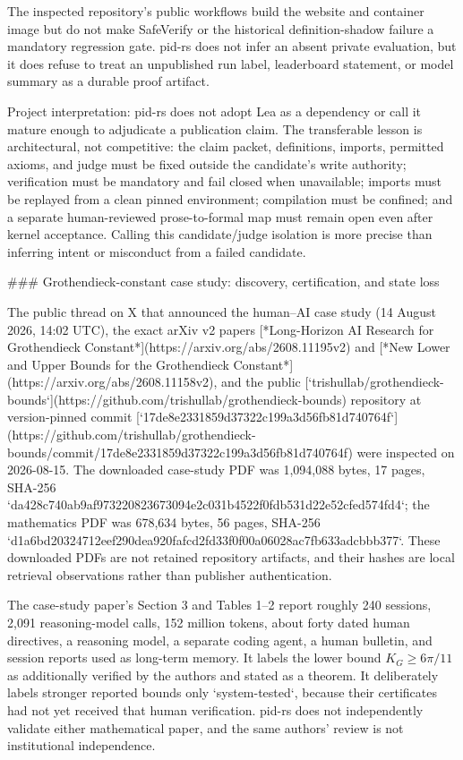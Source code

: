 \documentclass[11pt]{article}
\begin{document}
\begin{markdown}
The inspected repository's public workflows build the website and container image but do not make
SafeVerify or the historical definition-shadow failure a mandatory regression gate. pid-rs does
not infer an absent private evaluation, but it does refuse to treat an unpublished run label,
leaderboard statement, or model summary as a durable proof artifact.

Project interpretation: pid-rs does not adopt Lea as a dependency or call it mature enough to
adjudicate a publication claim. The transferable lesson is architectural, not competitive: the
claim packet, definitions, imports, permitted axioms, and judge must be fixed outside the
candidate's write authority; verification must be mandatory and fail closed when unavailable;
imports must be replayed from a clean pinned environment; compilation must be confined; and a
separate human-reviewed prose-to-formal map must remain open even after kernel acceptance. Calling
this candidate/judge isolation is more precise than inferring intent or misconduct from a failed
candidate.

### Grothendieck-constant case study: discovery, certification, and state loss

The public thread on X that announced the human--AI case study (14 August 2026, 14:02 UTC), the
exact arXiv v2 papers
[*Long-Horizon AI Research for Grothendieck Constant*](https://arxiv.org/abs/2608.11195v2) and
[*New Lower and Upper Bounds for the Grothendieck Constant*](https://arxiv.org/abs/2608.11158v2),
and the public
[`trishullab/grothendieck-bounds`](https://github.com/trishullab/grothendieck-bounds) repository at
version-pinned commit
[`17de8e2331859d37322c199a3d56fb81d740764f`](https://github.com/trishullab/grothendieck-bounds/commit/17de8e2331859d37322c199a3d56fb81d740764f)
were inspected on 2026-08-15. The downloaded case-study PDF was 1,094,088 bytes, 17 pages, SHA-256
`da428c740ab9af973220823673094e2c031b4522f0fdb531d22e52cfed574fd4`; the mathematics PDF was
678,634 bytes, 56 pages, SHA-256
`d1a6bd20324712eef290dea920fafcd2fd33f0f00a06028ac7fb633adcbbb377`. These downloaded PDFs are
not retained repository artifacts, and their hashes are local retrieval observations rather than
publisher authentication.

The case-study paper's Section 3 and Tables 1--2 report roughly 240 sessions, 2,091 reasoning-model
calls, 152 million tokens, about forty dated human directives, a reasoning model, a separate coding
agent, a human bulletin, and session reports used as long-term memory. It labels the lower bound
$K_G\geq 6\pi/11$ as additionally verified by the authors and stated as a theorem. It deliberately
labels stronger reported bounds only `system-tested`, because their certificates had not yet
received that human verification. pid-rs does not independently validate either mathematical
paper, and the same authors' review is not institutional independence.


\end{markdown}
\end{document}
